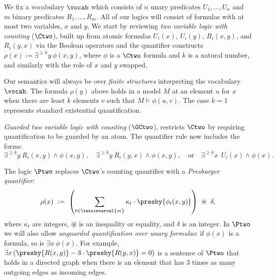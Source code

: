 We fix a vocabulary $\vocab$ which consists of $n$ unary predicates $U_1, \ldots, U_n$ and $m$ binary predicates $R_1, \ldots, R_m$. All of our logics will consist of formulas with at most two variables, $x$ and $y$.
We start by reviewing \emph{two variable logic with counting} ($\Ctwo$), built up from atomic formulas $U_i(x)$, $ U_i(y)$, $R_i(x, y)$, and $R_i(y, x)$
via the Boolean operators and the quantifier constructs
$\rho(x) := \exists^{\geq k} y\ \phi(x,y)$,
where $\phi$ is a $\Ctwo$ formula and $k$ is a natural number, and similarly with the role of $x$ and $y$ swapped.

Our semantics will always be over \emph{finite structures} interpreting the vocabulary $\vocab$.
The formula $\rho(y)$ above holds in a model $M$ at an element $u$ for $x$ when there are least $k$ elements $v$ such that $M \models \phi(u, v)$.
The case $k = 1$ represents standard existential quantification.

\emph{Guarded two variable logic with counting} ($\GCtwo$), restricts $\Ctwo$ by requiring quantification to be guarded by an atom. The quantifier rule now includes the forms:
\begin{equation*}
    \exists^{\geq k} y\ R_i(x, y) \land \phi(x,y),
    \quad
    \exists^{\geq k} y\ R_i(y,x) \land \phi(x,y),
    \quad \text{or} \quad
    \exists^{\geq k} x\ ~ U_i(x) \land \phi(x).
\end{equation*}


The logic $\Ptwo$ replaces $\Ctwo$'s counting quantifier with a \emph{Presburger quantifier}:
\begin{equation*}
    \rho(x)\ :=\ \left(
    \sum_{t \in \intsinterval{m}} \kappa_{t} \cdot \presby{ \phi_t(x,y)}  \right)
    \ \circledast\ \delta,
\end{equation*}
where $\kappa_t$ are integers,
$\circledast$ is an inequality or equality, and $\delta$ is an integer.
In $\Ptwo$ we will also allow \emph{unguarded quantification over unary formulas}: if $\phi(x)$ is a formula, so is
$\exists x\ \phi(x)$.
For example,
$\exists x \left(\presby{R(x,y)} - 3 \cdot \presby{R(y,x)} = 0\right)$
is a sentence of $\Ptwo$ that holds in a directed graph  when there is an element that has 3 times as many outgoing edges as incoming edges.

